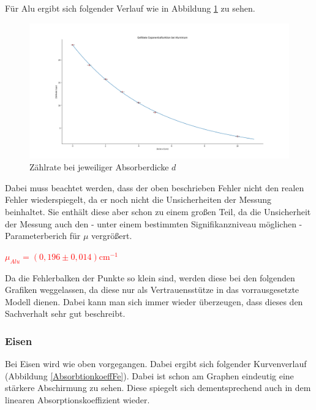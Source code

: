Für Alu ergibt sich folgender Verlauf wie in Abbildung \ref{AbsorbtionkoeffAlu} zu sehen.\\

\begin{figure}[ht]
    \centering
    \includegraphics[width = \linewidth]{Bilder/Auswertung/AbsorbtioskAlu.png}
    \caption{Zählrate bei jeweiliger Absorberdicke $d$}
    \label{AbsorbtionkoeffAlu}
\end{figure}

Dabei muss beachtet werden, dass der oben beschrieben Fehler nicht den realen Fehler wiederspiegelt, da er noch nicht die Unsicherheiten der Messung beinhaltet. 
Sie enthält diese aber schon zu einem großen Teil, da die Unsicherheit der Messung auch den - unter einem bestimmten Signifikanzniveau möglichen - Parameterberich für $\mu$ 
vergrößert.

\begin{center}
    \centering
    \textcolor{red}{$\mu_{Alu}= (0,196 \pm 0,014) \mathrm{cm}^{-1}$}
\end{center}

Da die Fehlerbalken der Punkte so klein sind, werden diese bei den folgenden Grafiken weggelassen, da diese nur als Vertrauensstütze in das vorrausgesetzte Modell dienen. Dabei kann man sich 
immer wieder überzeugen, dass dieses den Sachverhalt sehr gut beschreibt.

\subsubsection*{Eisen}
Bei Eisen wird wie oben vorgegangen. Dabei ergibt sich folgender Kurvenverlauf (Abbildung \ref{AbsorbtionkoeffFe}). Dabei ist schon am Graphen eindeutig eine stärkere Abschirmung zu sehen. Diese spiegelt sich dementsprechend 
auch in dem linearen Absorptionskoeffizient wieder.

